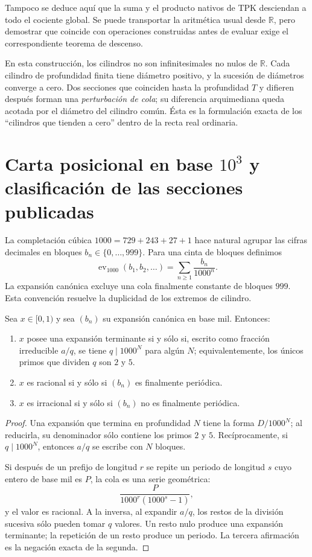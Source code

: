 Tampoco se deduce aquí que la suma y el producto nativos de TPK desciendan a
todo el cociente global. Se puede transportar la aritmética usual desde
\(\mathbb R\), pero demostrar que coincide con operaciones construidas antes
de evaluar exige el correspondiente teorema de descenso.

En esta construcción, los cilindros no son infinitesimales no nulos de
\(\mathbb R\). Cada cilindro de profundidad finita tiene diámetro positivo,
y la sucesión de diámetros converge a cero. Dos secciones que coinciden hasta
la profundidad \(T\) y difieren después forman una \emph{perturbación de
cola}; su diferencia arquimediana queda acotada por el diámetro del cilindro
común. Ésta es la formulación exacta de los ``cilindros que tienden a cero''
dentro de la recta real ordinaria.

\section{Carta posicional en base \(10^3\) y clasificación de las secciones publicadas}

La completación cúbica
\(1000=729+243+27+1\) hace natural agrupar las cifras decimales en bloques
\(b_n\in\{0,\ldots,999\}\). Para una cinta de bloques definimos
\[
 \operatorname{ev}_{1000}(b_1,b_2,\ldots)
 =\sum_{n\geq1}\frac{b_n}{1000^n}.
\]
La expansión canónica excluye una cola finalmente constante de bloques
\(999\). Esta convención resuelve la duplicidad de los extremos de cilindro.

\begin{theorem}
\label{thm:taxonomia-base-mil}
Sea \(x\in[0,1)\) y sea \((b_n)\) su expansión canónica en base mil.
Entonces:
\begin{enumerate}
\item \(x\) posee una expansión terminante si y sólo si, escrito como
fracción irreducible \(a/q\), se tiene \(q\mid1000^N\) para algún \(N\);
equivalentemente, los únicos primos que dividen \(q\) son \(2\) y \(5\).
\item \(x\) es racional si y sólo si \((b_n)\) es finalmente periódica.
\item \(x\) es irracional si y sólo si \((b_n)\) no es finalmente
periódica.
\end{enumerate}
\end{theorem}

\begin{proof}
Una expansión que termina en profundidad \(N\) tiene la forma
\(D/1000^N\); al reducirla, su denominador sólo contiene los primos \(2\) y
\(5\). Recíprocamente, si \(q\mid1000^N\), entonces \(a/q\) se escribe con
\(N\) bloques.

Si después de un prefijo de longitud \(r\) se repite un periodo de longitud
\(s\) cuyo entero de base mil es \(P\), la cola es una serie geométrica:
\[
 \frac{P}{1000^r(1000^s-1)},
\]
y el valor es racional. A la inversa, al expandir \(a/q\), los restos de la
división sucesiva sólo pueden tomar \(q\) valores. Un resto nulo produce una
expansión terminante; la repetición de un resto produce un periodo. La tercera
afirmación es la negación exacta de la segunda.
\end{proof}

